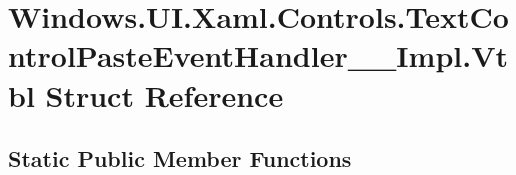 \hypertarget{struct_windows_1_1_u_i_1_1_xaml_1_1_controls_1_1_text_control_paste_event_handler_____impl_1_1_vtbl}{}\section{Windows.\+U\+I.\+Xaml.\+Controls.\+Text\+Control\+Paste\+Event\+Handler\+\_\+\+\_\+\+Impl.\+Vtbl Struct Reference}
\label{struct_windows_1_1_u_i_1_1_xaml_1_1_controls_1_1_text_control_paste_event_handler_____impl_1_1_vtbl}
\subsection*{Static Public Member Functions}
